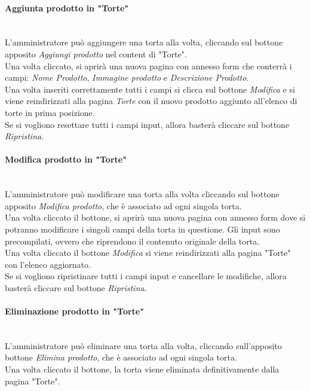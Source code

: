 \paragraph{Aggiunta prodotto in "Torte"}\mbox{}\\
\label{par:AddT}
L'amministratore può aggiungere una torta alla volta, cliccando sul bottone apposito \emph{Aggiungi prodotto} nel content di "Torte".\\
Una volta cliccato, si aprirà una nuova pagina con annesso form che conterrà i campi: \emph{Nome Prodotto}, \emph{Immagine prodotto} e \emph{Descrizione Prodotto}.\\ 
Una volta inseriti correttamente tutti i campi si clicca sul bottone \emph{Modifica} e si viene reindirizzati alla pagina \emph{Torte} con il nuovo prodotto 
aggiunto all'elenco di torte in prima posizione.\\
Se si vogliono resettare tutti i campi input, allora basterà cliccare sul bottone \emph{Ripristina}.

\paragraph{Modifica prodotto in "Torte"}\mbox{}\\
\label{par:ModT}
L'amministratore può modificare una torta alla volta cliccando sul bottone apposito \emph{Modifica prodotto}, che è associato ad ogni singola torta.\\ 
Una volta cliccato il bottone, si aprirà una nuova pagina con annesso form dove si potranno modificare i singoli campi della torta in questione. 
Gli input sono precompilati, ovvero che riprendono il contenuto originale della torta.\\
Una volta cliccato il bottone \emph{Modifica} si viene reindirizzati alla pagina "Torte" con l'elenco aggiornato.\\
Se si vogliono ripristinare tutti i campi input e cancellare le modifiche, allora basterà cliccare sul bottone \emph{Ripristina}.

\paragraph{Eliminazione prodotto in "Torte"}\mbox{}\\
\label{par:DelT}
L'amministratore può eliminare una torta alla volta, cliccando sull'apposito bottone \emph{Elimina prodotto}, che è associato ad ogni singola torta.\\ 
Una volta cliccato il bottone, la torta viene eliminata definitivamente dalla pagina "Torte".\\

